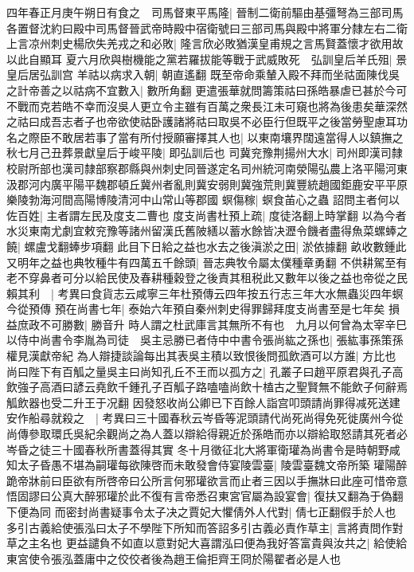四年春正月庚午朔日有食之　司馬督東平馬隆|{
	晉制二衛前驅由基彊弩為三部司馬各置督沈約曰殿中司馬督晉武帝時殿中宿衛號曰三部司馬與殿中將軍分隸左右二衛}
上言凉州刺史楊欣失羌戎之和必敗|{
	隆言欣必敗猶漢皇甫規之言馬賢蓋懷才欲用故以此自顯耳}
夏六月欣與樹機能之黨若羅拔能等戰于武威敗死　弘訓皇后羊氏殂|{
	景皇后居弘訓宫}
羊祜以病求入朝|{
	朝直遙翻}
既至帝命乘輦入殿不拜而坐祜面陳伐吳之計帝善之以祜病不宜數入|{
	數所角翻}
更遣張華就問籌策祜曰孫皓暴虐已甚於今可不戰而克若皓不幸而沒吳人更立令主雖有百萬之衆長江未可窺也將為後患矣華深然之祜曰成吾志者子也帝欲使祜卧護諸將祜曰取吳不必臣行但既平之後當勞聖慮耳功名之際臣不敢居若事了當有所付授願審擇其人也|{
	以東南壤界闊遠當得人以鎮撫之}
秋七月己丑葬景獻皇后于峻平陵|{
	即弘訓后也}
司冀兖豫荆揚州大水|{
	司州即漢司隸校尉所部也漢司隸部察郡縣與州刺史同晉遂定名司州統河南滎陽弘農上洛平陽河東汲郡河内廣平陽平魏郡頓丘冀州者亂則冀安弱則冀強荒則冀豐統趙國鉅鹿安平平原樂陵勃海河間高陽博陵清河中山常山等郡國}
螟傷稼|{
	螟食苖心之蟲}
詔問主者何以佐百姓|{
	主者謂左民及度支二曹也}
度支尚書杜預上疏|{
	度徒洛翻上時掌翻}
以為今者水災東南尤劇宜敕兖豫等諸州留漢氏舊陂繕以蓄水餘皆决瀝令饑者盡得魚菜螺蜯之饒|{
	螺盧戈翻蜯步項翻}
此目下日給之益也水去之後滇淤之田|{
	淤依據翻}
畝收數鍾此又明年之益也典牧種牛有四萬五千餘頭|{
	晉志典牧令屬太僕種章勇翻}
不供耕駕至有老不穿鼻者可分以給民使及春耕種穀登之後責其租税此又數年以後之益也帝從之民賴其利　|{
	考異曰食貨志云咸寧三年杜預傳云四年按五行志三年大水無蟲災四年螟今從預傳}
預在尚書七年|{
	泰始六年預自秦州刺史得罪歸拜度支尚書至是七年矣}
損益庶政不可勝數|{
	勝音升}
時人謂之杜武庫言其無所不有也　九月以何曾為太宰辛巳以侍中尚書令李胤為司徒　吳主忌勝已者侍中中書令張尚紘之孫也|{
	張紘事孫策孫權見漢獻帝紀}
為人辯捷談論每出其表吳主積以致恨後問孤飲酒可以方誰|{
	方比也}
尚曰陛下有百觚之量吳主曰尚知孔丘不王而以孤方之|{
	孔叢子曰趙平原君與孔子高飲強子高酒曰諺云堯飲千鍾孔子百觚子路嗑嗑尚飲十榼古之聖賢無不能飲子何辭焉觚飲器也受二升王于况翻}
因發怒收尚公卿已下百餘人詣宫叩頭請尚罪得减死送建安作船尋就殺之　|{
	考異曰三十國春秋云岑昏等泥頭請代尚死尚得免死徙廣州今從尚傳參取環氏吳紀余觀尚之為人蓋以辯給得親近於孫皓而亦以辯給取怒請其死者必岑昏之徒三十國春秋所書蓋得其實}
冬十月徵征北大將軍衛瓘為尚書令是時朝野咸知太子昏愚不堪為嗣瓘每欲陳啓而未敢發會侍宴陵雲臺|{
	陵雲臺魏文帝所築}
瓘陽醉跪帝牀前曰臣欲有所啓帝曰公所言何邪瓘欲言而止者三因以手撫牀曰此座可惜帝意悟固謬曰公真大醉邪瓘於此不復有言帝悉召東宮官屬為設宴會|{
	復扶又翻為于偽翻下便為同}
而密封尚書疑事令太子决之賈妃大懼倩外人代對|{
	倩七正翻假手於人也}
多引古義給使張泓曰太子不學陛下所知而答詔多引古義必責作草主|{
	言將責問作對草之主名也}
更益譴負不如直以意對妃大喜謂泓曰便為我好答富貴與汝共之|{
	給使給東宮使令張泓蓋庸中之佼佼者後為趙王倫拒齊王冏於陽翟者必是人也}
